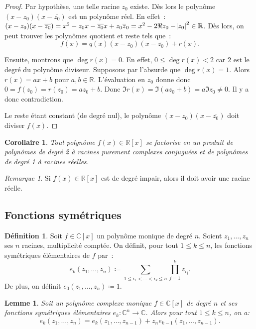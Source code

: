 \documentclass{article}
\newcommand{\R}{\mathbb R}
\newcommand{\C}{\mathbb C}
\newtheorem{cor}[thm]{Corollaire}
\newtheorem{lem}[thm]{Lemme}
\theoremstyle{definition}
\newtheorem{déf}[thm]{Définition}
\theoremstyle{remark}
\newtheorem*{rmq}{Remarque}
\begin{document}
		\begin{proof} Par hypothèse, une telle racine $z_0$ existe. Dès lors le polynôme $(x-z_0)(x-\overline {z_0})$ est un polynôme réel. En effet~:
		$(x-z_0)(x-\overline {z_0}) = x^2 -z_0x - \overline {z_0}x + z_0\overline z_0 = x^2 - 2\Re z_0 - \abs{z_0}^2 \in \R$. Dès lors, on peut trouver les polynômes
		quotient et reste tels que~: \[f(x) = q(x)(x-z_0)(x-\overline {z_0}) + r(x).\]
		
		Ensuite, montrons que $\deg r(x) = 0$. En effet, $0 \leq \deg r(x) < 2$ car 2 est le degré du polynôme diviseur. Supposons par l'absurde que $\deg r(x) = 1$.
		Alors $r(x) = ax+b$ pour $a, b \in \R$. L'évaluation en $z_0$ donne donc $0 = f(z_0) = r(z_0) = az_0+b$. Donc $\Im r(x) = \Im(az_0+b) = a\Im z_0 \neq 0$. Il y
		a donc contradiction.
		
		Le reste étant constant (de degré nul), le polynôme $(x-z_0)(x-\overline{z_0})$ doit diviser $f(x)$. \end{proof}

		\begin{cor} Tout polynôme $f(x) \in \R[x]$ se factorise en un produit de polynômes de degré 2 à racines purement complexes conjuguées et de polynômes de
		degré 1 à racines réelles. \end{cor}

		\begin{rmq} Si $f(x) \in \R[x]$ est de degré impair, alors il doit avoir une racine réelle. \end{rmq}

	\subsection{Fonctions symétriques}
		\begin{déf} Soit $f \in \C[x]$ un polynôme monique de degré $n$. Soient $z_1, \dotsc, z_n$ ses $n$ racines, multiplicité comptée. On définit, pour tout
		$1 \leq k \leq n$, les fonctions symétriques élémentaires de $f$ par~:
		\[e_k(z_1, \dotsc, z_n) \coloneqq \sum_{1 \leq i_1 < \ldots < i_k \leq n}\prod_{j=1}^kz_{i_j}.\]
		De plus, on définit $e_0(z_1, \dotsc, z_n) \coloneqq 1$. \end{déf}

		\begin{lem} Soit un polynôme complexe monique $f \in \C[x]$ de degré $n$ et ses fonctions symétriques élémentaires $e_k : \C^n \to \C$. Alors pour tout
		$1 \leq k \leq n$, on a: \[e_k(z_1, \dotsc, z_n) = e_k(z_1, \dotsc, z_{n-1}) + z_ne_{k-1}(z_1, \dotsc, z_{n-1}).\]\end{lem}
\end{document}
